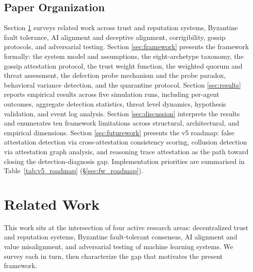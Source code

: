 \subsection{Paper Organization}

Section \ref{sec:related} surveys related work across trust and reputation systems,
Byzantine fault tolerance, AI alignment and deceptive alignment, corrigibility, gossip
protocols, and adversarial testing.  Section \ref{sec:framework} presents the framework
formally: the system model and assumptions, the eight-archetype taxonomy, the gossip
attestation protocol, the trust weight function, the weighted quorum and threat
assessment, the defection probe mechanism and the probe paradox, behavioral variance
detection, and the quarantine protocol.  Section \ref{sec:results} reports empirical
results across five simulation runs, including per-agent outcomes, aggregate detection
statistics, threat level dynamics, hypothesis validation, and event log analysis.
Section \ref{sec:discussion} interprets the results and enumerates ten framework
limitations across structural, architectural, and empirical dimensions.  Section
\ref{sec:futurework} presents the v5 roadmap: false attestation detection via
cross-attestation consistency scoring, collusion detection via attestation graph
analysis, and reasoning trace attestation as the path toward closing the
detection-diagnosis gap.  Implementation priorities are summarised in
Table~\ref{tab:v5_roadmap} (\S\ref{sec:fw_roadmap}).

\section{Related Work}
\label{sec:related}

This work sits at the intersection of four active research areas: decentralized trust and
reputation systems, Byzantine fault-tolerant consensus, AI alignment and value
misalignment, and adversarial testing of machine learning systems.  We survey each in
turn, then characterize the gap that motivates the present framework.

